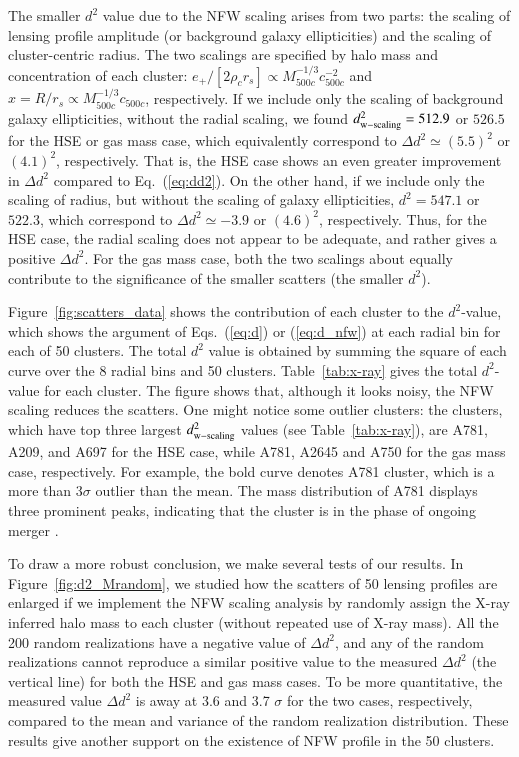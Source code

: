 \documentclass[iop, apj]{emulateapj}
\newcommand{\?}{\stackrel{?}{=}}
\begin{document}
The smaller $d^2$ value due to the NFW scaling arises from two parts:
the scaling of lensing profile amplitude (or background galaxy
ellipticities) and the scaling of cluster-centric radius. The two
scalings are specified by halo mass and concentration of each cluster:
$e_+/[2\rho_c r_s]\propto M_{500c}^{-1/3}c_{500c}^{-2}$ and
$x=R/r_s\propto M_{500c}^{-1/3}c_{500c}$, respectively. If we include
only the scaling of background galaxy ellipticities, without the radial
scaling, we found $d^2_{\rm w-scaling}=512.9$ or $526.5$ for the HSE or
gas mass case, which equivalently correspond to $\Delta d^2\simeq
(5.5)^2$ or $(4.1)^2$, respectively. That is, the HSE case shows an even
greater improvement in $\Delta d^2$ compared to Eq.~(\ref{eq:dd2}).  On
the other hand, if we include only the scaling of radius, but without
the scaling of galaxy ellipticities, $d^2=547.1$ or $522.3$, which
correspond to $\Delta d^2\simeq -3.9$ or $(4.6)^2$, respectively. Thus,
for the HSE case, the radial scaling does not appear to be adequate, and
rather gives a positive $\Delta d^2$.  For the gas mass case, both the
two scalings about equally contribute to the significance of the smaller
scatters (the smaller $d^2$).

Figure~\ref{fig:scatters_data} shows the contribution of each cluster to
the $d^2$-value, which shows the argument of Eqs.~(\ref{eq:d}) or
(\ref{eq:d_nfw}) at each radial bin for each of 50 clusters. The total
$d^2$ value is obtained by summing the square of each curve over the 8
radial bins and 50 clusters. Table~\ref{tab:x-ray} gives the total
$d^2$-value for each cluster.  The figure shows that, although it looks
noisy, the NFW scaling reduces the scatters. One might notice some
outlier clusters: the clusters, which have top three largest $d^2_{\rm
w-scaling}$ values (see Table~\ref{tab:x-ray}), are A781, A209, and A697
for the HSE case, while A781, A2645 and A750 for the gas mass case,
respectively.  For example, the bold curve denotes A781 cluster, which
is a more than $3\sigma$ outlier than the mean. The mass distribution of
A781 displays three prominent peaks, indicating that the cluster is in
the phase of ongoing merger \citep{Wittmanetal:14}.

To draw a more robust conclusion, we make several tests of our
results. In Figure~\ref{fig:d2_Mrandom}, we studied how the scatters of
50 lensing profiles are enlarged if we implement the NFW scaling
analysis by randomly assign the X-ray inferred halo mass to each cluster
(without repeated use of X-ray mass).  All the 200 random realizations
have a negative value of $\Delta d^2$, and any of the random
realizations cannot reproduce a similar positive value to the measured
$\Delta d^2$ (the vertical line) for both the HSE and gas mass cases.
To be more quantitative, the measured value $\Delta d^2$ is away at 3.6
and 3.7 $\sigma$ for the two cases, respectively, compared to the mean
and variance of the random realization distribution. These results give
another support on the existence of NFW profile in the 50 clusters.
\end{document}

